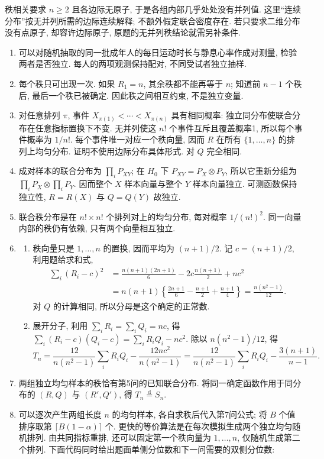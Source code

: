 \begin{solution}
秩相关要求 $n\ge2$ 且各边际无原子, 于是各组内部几乎处处没有并列值. 这里“连续分布”按无并列所需的边际连续解释; 不额外假定联合密度存在. 若只要求二维分布没有点原子, 却容许边际原子, 原题的无并列秩结论就需另补条件.
\begin{enumerate}[label=\arabic*.]
\item 可以对随机抽取的同一批成年人的每日运动时长与静息心率作成对测量, 检验两者是否独立. 每人的两项观测保持配对, 不同受试者独立抽样.
\item 每个秩只可出现一次. 如果 $R_1=n$, 其余秩都不能再等于 $n$; 知道前 $n-1$ 个秩后, 最后一个秩已被确定. 因此秩之间相互约束, 不是独立变量.
\item 对任意排列 $\pi$, 事件 $X_{\pi(1)}<\cdots<X_{\pi(n)}$ 具有相同概率: 独立同分布使联合分布在任意指标置换下不变. 无并列使这 $n!$ 个事件互斥且覆盖概率1, 所以每个事件概率为 $1/n!$. 每个事件唯一对应一个秩向量, 因而 $R$ 在所有 $\{1,\ldots,n\}$ 的排列上均匀分布. 证明不使用边际分布具体形式. 对 $Q$ 完全相同.
\item 成对样本的联合分布为 $\prod_iP_{XY}$; 在 $H_0$ 下 $P_{XY}=P_X\otimes P_Y$, 所以它重新分组为 $\prod_iP_X\otimes\prod_iP_Y$. 因而整个 $X$ 样本向量与整个 $Y$ 样本向量独立. 可测函数保持独立性, $R=R(X)$ 与 $Q=Q(Y)$ 故独立.
\item 联合秩分布是在 $n!\times n!$ 个排列对上的均匀分布, 每对概率 $1/(n!)^2$. 同一向量内部的秩仍有依赖, 只有两个向量相互独立.
\item
\begin{enumerate}[label=\alph*)]
\item 秩向量只是 $1,\ldots,n$ 的置换, 因而平均为 $(n+1)/2$. 记 $c=(n+1)/2$, 利用题给求和式,
\begin{align*}
\sum_i(R_i-c)^2
&=\frac{n(n+1)(2n+1)}6-2c\frac{n(n+1)}2+nc^2\\
&=n(n+1)\left\{\frac{2n+1}6-\frac{n+1}2+\frac{n+1}4\right\}
=\frac{n(n^2-1)}{12}.
\end{align*}
对 $Q$ 的计算相同, 所以分母是这个确定的正常数.
\item 展开分子, 利用 $\sum_iR_i=\sum_iQ_i=nc$, 得
$\sum_i(R_i-c)(Q_i-c)=\sum_iR_iQ_i-nc^2$.
除以 $n(n^2-1)/12$, 得
\[
T_n=\frac{12}{n(n^2-1)}\sum_iR_iQ_i-
\frac{12nc^2}{n(n^2-1)}
=\frac{12}{n(n^2-1)}\sum_iR_iQ_i-\frac{3(n+1)}{n-1}.
\]
\end{enumerate}
\item 两组独立均匀样本的秩恰有第5问的已知联合分布. 将同一确定函数作用于同分布的 $(R,Q)$ 与 $(R',Q')$, 得 $T_n\stackrel{\mathrm d}=S_n$.
\item 可以逐次产生两组长度 $n$ 的均匀样本, 各自求秩后代入第7问公式; 将 $B$ 个值排序取第 $\lceil B(1-\alpha)\rceil$ 个. 更快的等价算法是在每次模拟生成两个独立均匀随机排列. 由共同指标重排, 还可以固定第一个秩向量为 $1,\ldots,n$, 仅随机生成第二个排列. 下面代码同时给出题面单侧分位数和下一问需要的双侧分位数:

\end{enumerate}
\end{solution}
